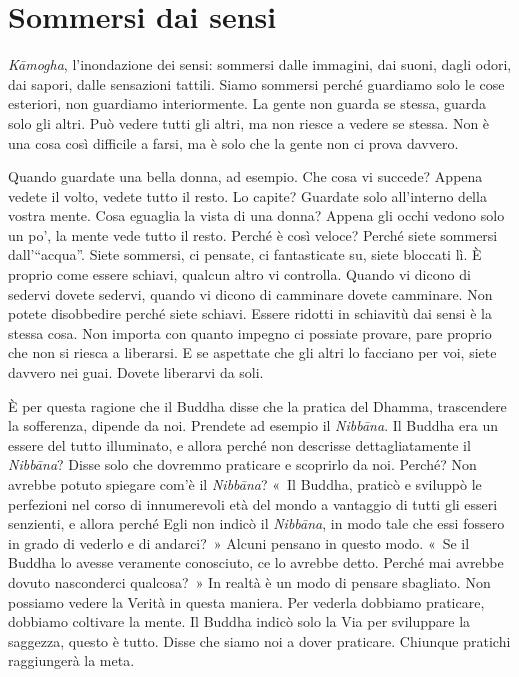 \chapter{Sommersi dai sensi}

\emph{Kāmogha}, l'inondazione dei sensi: sommersi dalle immagini, dai
suoni, dagli odori, dai sapori, dalle sensazioni tattili. Siamo sommersi
perché guardiamo solo le cose esteriori, non guardiamo interiormente. La
gente non guarda se stessa, guarda solo gli altri. Può vedere tutti gli
altri, ma non riesce a vedere se stessa. Non è una cosa così difficile a
farsi, ma è solo che la gente non ci prova davvero.

Quando guardate una bella donna, ad esempio. Che cosa vi succede? Appena
vedete il volto, vedete tutto il resto. Lo capite? Guardate solo
all'interno della vostra mente. Cosa eguaglia la vista di una donna?
Appena gli occhi vedono solo un po', la mente vede tutto il resto.
Perché è così veloce? Perché siete sommersi dall'``acqua''. Siete
sommersi, ci pensate, ci fantasticate su, siete bloccati lì. È proprio
come essere schiavi, qualcun altro vi controlla. Quando vi dicono di
sedervi dovete sedervi, quando vi dicono di camminare dovete camminare.
Non potete disobbedire perché siete schiavi. Essere ridotti in schiavitù
dai sensi è la stessa cosa. Non importa con quanto impegno ci possiate
provare, pare proprio che non si riesca a liberarsi. E se aspettate che
gli altri lo facciano per voi, siete davvero nei guai. Dovete liberarvi
da soli.

È per questa ragione che il Buddha disse che la pratica del Dhamma,
trascendere la sofferenza, dipende da noi. Prendete ad esempio il
\emph{Nibbāna}. Il Buddha era un essere del tutto illuminato, e allora
perché non descrisse dettagliatamente il \emph{Nibbāna}? Disse solo che
dovremmo praticare e scoprirlo da noi. Perché? Non avrebbe potuto
spiegare com'è il \emph{Nibbāna}? «~Il Buddha, praticò e sviluppò le
perfezioni nel corso di innumerevoli età del mondo a vantaggio di tutti
gli esseri senzienti, e allora perché Egli non indicò il \emph{Nibbāna},
in modo tale che essi fossero in grado di vederlo e di andarci?~» Alcuni
pensano in questo modo. «~Se il Buddha lo avesse veramente conosciuto,
ce lo avrebbe detto. Perché mai avrebbe dovuto nasconderci qualcosa?~»
In realtà è un modo di pensare sbagliato. Non possiamo vedere la Verità
in questa maniera. Per vederla dobbiamo praticare, dobbiamo coltivare la
mente. Il Buddha indicò solo la Via per sviluppare la saggezza, questo è
tutto. Disse che siamo noi a dover praticare. Chiunque pratichi
raggiungerà la meta.

